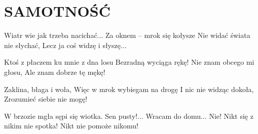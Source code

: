 \documentclass[../../../songbook.tex]{subfiles}
\begin{document}
\TabPositions{8cm} %
\section*{SAMOTNOŚĆ}
{}
\vspace{0.5cm}
Wiatr wie jak trzeba nacichać...	 \newline	 
Za oknem – mrok się kołysze			 \newline	 
Nie widać świata nie słychać,		 \newline	 
Lecz ja coś widzę i słyszę...		 \newline	 

Ktoś z płaczem ku mnie z dna losu	 \newline	 
Bezradną wyciąga rękę!				 \newline	
Nie znam obcego mi głosu,			 \newline	
Ale znam dobrze tę mękę!			 \newline

Zaklina, błaga i woła, \newline
Więc w mrok wybiegam na drogę \newline
I nic nie widząc dokoła, \newline
Zrozumieć siebie nie mogę! \newline

W brzozie mgła sępi się wiotka. \newline
Sen pusty!... Wracam do domu... \newline
Nie! Nikt się z nikim nie spotka! \newline
Nikt nie pomoże nikomu! \newline
\end{document}
